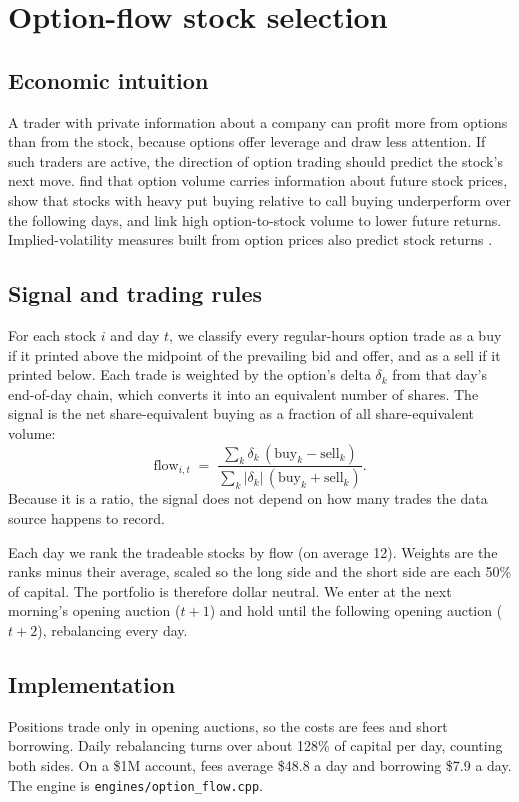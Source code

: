 \documentclass[../main.tex]{subfiles}
\begin{document}
\section{Option-flow stock selection}\label{sec:flow}

\subsection{Economic intuition}
A trader with private information about a company can profit more from options than from the stock, because options offer leverage and draw less attention. If such traders are active, the direction of option trading should predict the stock's next move. \citet{easley1998} find that option volume carries information about future stock prices, \citet{pan2006} show that stocks with heavy put buying relative to call buying underperform over the following days, and \citet{johnsonso2012} link high option-to-stock volume to lower future returns. Implied-volatility measures built from option prices also predict stock returns \citep{cremers2010,xing2010}.

\subsection{Signal and trading rules}
For each stock $i$ and day $t$, we classify every regular-hours option trade as a buy if it printed above the midpoint of the prevailing bid and offer, and as a sell if it printed below. Each trade is weighted by the option's delta $\delta_k$ from that day's end-of-day chain, which converts it into an equivalent number of shares. The signal is the net share-equivalent buying as a fraction of all share-equivalent volume:
\begin{equation}
  \text{flow}_{i,t} \;=\; \frac{\sum_k \delta_k\,(\text{buy}_k - \text{sell}_k)}{\sum_k |\delta_k|\,(\text{buy}_k + \text{sell}_k)} .
\end{equation}
Because it is a ratio, the signal does not depend on how many trades the data source happens to record.

Each day we rank the tradeable stocks by flow (on average 12). Weights are the ranks minus their average, scaled so the long side and the short side are each 50\% of capital. The portfolio is therefore dollar neutral. We enter at the next morning's opening auction ($t+1$) and hold until the following opening auction ($t+2$), rebalancing every day.

\subsection{Implementation}
Positions trade only in opening auctions, so the costs are fees and short borrowing. Daily rebalancing turns over about 128\% of capital per day, counting both sides. On a \$1M account, fees average \$48.8 a day and borrowing \$7.9 a day. The engine is \texttt{engines/option\_flow.cpp}.
\end{document}
